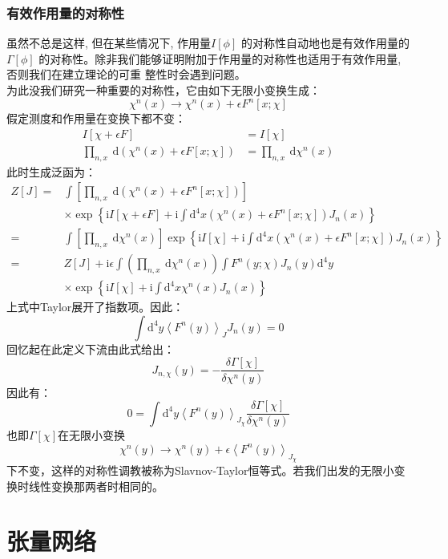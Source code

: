 \documentclass[12pt, a4paper, oneside]{ctexbook}
\begin{document}
	\subsection{有效作用量的对称性}
	虽然不总是这样, 但在某些情况下, 作用量$ I[\phi] $ 的对称性自动地也是有效作用量的$ \Gamma[\phi] $ 的对称性。除非我们能够证明附加于作用量的对称性也适用于有效作用量, 否则我们在建立理论的可重 整性时会遇到问题。\\
	为此没我们研究一种重要的对称性，它由如下无限小变换生成：
	\begin{equation}
		\chi^n(x) \rightarrow \chi^n(x)+\epsilon F^n[x ; \chi]
	\end{equation}
	假定测度和作用量在变换下都不变：
	\begin{equation}
		\begin{aligned}
			I[\chi+\epsilon F] & =I[\chi] \\
			\prod_{n, x} \mathrm{~d}\left(\chi^n(x)+\epsilon F[x ; \chi]\right) & =\prod_{n, x} \mathrm{~d} \chi^n(x)
			\end{aligned}
	\end{equation}
	此时生成泛函为：
	\begin{equation}
		\begin{aligned}
			Z[J]= & \int\left[\prod_{n, x} \mathrm{~d}\left(\chi^n(x)+\epsilon F^n[x ; \chi]\right)\right] \\
			& \times \exp \left\{\mathrm{i} I[\chi+\epsilon F]+\mathrm{i} \int \mathrm{d}^4 x\left(\chi^n(x)+\epsilon F^n[x ; \chi]\right) J_n(x)\right\} \\
			= & \int\left[\prod_{n, x} \mathrm{~d} \chi^n(x)\right] \exp \left\{\mathrm{i} I[\chi]+\mathrm{i} \int \mathrm{d}^4 x\left(\chi^n(x)+\epsilon F^n[x ; \chi]\right) J_n(x)\right\} \\
			= & Z[J]+\mathrm{i} \epsilon \int\left(\prod_{n, x} \mathrm{~d} \chi^n(x)\right) \int F^n(y ; \chi) J_n(y) \mathrm{d}^4 y \\
			& \times \exp \left\{\mathrm{i} I[\chi]+\mathrm{i} \int \mathrm{d}^4 x \chi^n(x) J_n(x)\right\}
			\end{aligned}
	\end{equation}
	上式中Taylor展开了指数项。因此：
	\begin{equation}
		\int \mathrm{d}^4 y\left\langle F^n(y)\right\rangle_J J_n(y)=0
	\end{equation}
	回忆起在此定义下流由此式给出：
	\begin{equation}
		J_{n, \chi}(y)=-\frac{\delta \Gamma[\chi]}{\delta \chi^n(y)}
	\end{equation}
	因此有：
	\begin{equation}
		0=\int \mathrm{d}^4 y\left\langle F^n(y)\right\rangle_{J_\chi} \frac{\delta \Gamma[\chi]}{\delta \chi^n(y)}
	\end{equation}
	也即$ \Gamma[\chi] $在无限小变换
	\begin{equation}
		\chi^n(y) \rightarrow \chi^n(y)+\epsilon\left\langle F^n(y)\right\rangle_{J_\chi}
	\end{equation} 
	下不变，这样的对称性调教被称为Slavnov-Taylor恒等式。若我们出发的无限小变换时线性变换那两者时相同的。
	\chapter{张量网络}
	
	
\end{document}
